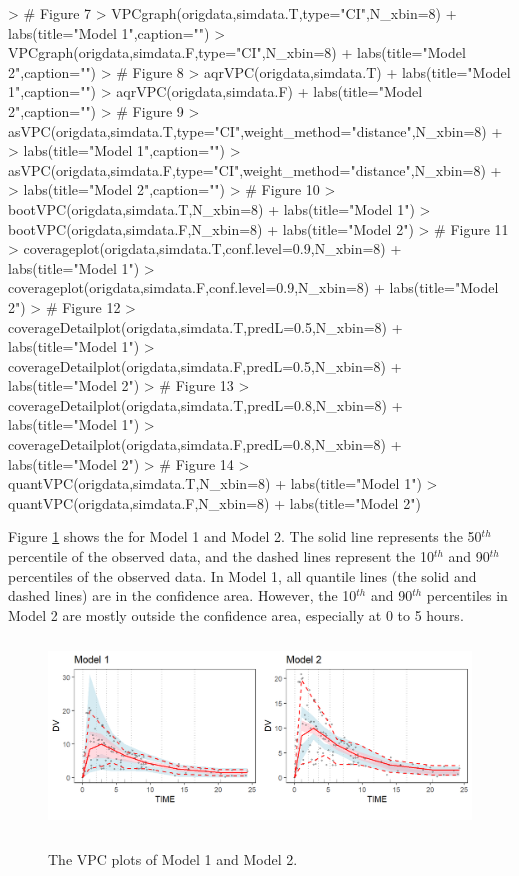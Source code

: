\begin{Schunk}
\begin{Sinput}
> # Figure 7
> VPCgraph(origdata,simdata.T,type="CI",N_xbin=8) + labs(title="Model 1",caption="")
> VPCgraph(origdata,simdata.F,type="CI",N_xbin=8) + labs(title="Model 2",caption="")
> # Figure 8
> aqrVPC(origdata,simdata.T) + labs(title="Model 1",caption="")
> aqrVPC(origdata,simdata.F) + labs(title="Model 2",caption="")
> # Figure 9
> asVPC(origdata,simdata.T,type="CI",weight_method="distance",N_xbin=8) +
>     labs(title="Model 1",caption="")
> asVPC(origdata,simdata.F,type="CI",weight_method="distance",N_xbin=8) +
>     labs(title="Model 2",caption="")
> # Figure 10
> bootVPC(origdata,simdata.T,N_xbin=8) + labs(title="Model 1")
> bootVPC(origdata,simdata.F,N_xbin=8) + labs(title="Model 2")
> # Figure 11
> coverageplot(origdata,simdata.T,conf.level=0.9,N_xbin=8) + labs(title="Model 1")
> coverageplot(origdata,simdata.F,conf.level=0.9,N_xbin=8) + labs(title="Model 2")
> # Figure 12
> coverageDetailplot(origdata,simdata.T,predL=0.5,N_xbin=8) + labs(title="Model 1")
> coverageDetailplot(origdata,simdata.F,predL=0.5,N_xbin=8) + labs(title="Model 2")
> # Figure 13
> coverageDetailplot(origdata,simdata.T,predL=0.8,N_xbin=8) + labs(title="Model 1")
> coverageDetailplot(origdata,simdata.F,predL=0.8,N_xbin=8) + labs(title="Model 2")
> # Figure 14
> quantVPC(origdata,simdata.T,N_xbin=8) + labs(title="Model 1")
> quantVPC(origdata,simdata.F,N_xbin=8) + labs(title="Model 2")
\end{Sinput}
\end{Schunk}

Figure \ref{M11} shows the  for Model 1 and Model 2.
The solid line represents the 50$^{th}$ percentile of the observed data, and the dashed lines represent the 10$^{th}$ and 90$^{th}$ percentiles of the observed data. In Model 1, all quantile lines (the solid and dashed lines) are in the confidence area. However, the 10$^{th}$ and 90$^{th}$ percentiles in Model 2 are mostly outside the confidence area, especially at 0 to 5 hours.

\begin{figure}
\caption{The VPC plots of Model 1 and Model 2.}
\centering
\includegraphics[width=5in,height=2in]{plotPNG/M11-1.png}
\label{M11}
\end{figure}



